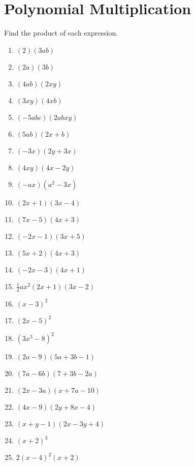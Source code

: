 \documentclass{article}
\begin{document}
\section{Polynomial Multiplication}
Find the product of each expression.
\begin{enumerate}
\item $(2)(3ab)$
\item $(2a)(3b)$
\item $(4ab)(2xy)$
\item $(3xy)(4xb)$
\item $(-5abc)(2abxy)$
\item $(5ab)(2x+b)$
\item $(-3x)(2y+3x)$
\item $(4xy)(4x-2y)$
\item $(-ax)(a^{2}-3x)$
\item $(2x+1)(3x-4)$
\item $(7x-5)(4x+3)$
\item $(-2x-1)(3x+5)$
\item $(5x+2)(4x+3)$
\item $(-2x-3)(4x+1)$
\item $\frac{1}{2}ax^{2}(2x+1)(3x-2)$
\item $(x-3)^{2}$
\item $(2x-5)^{2}$
\item $(3x^{3}-8)^{2}$
\item $(2a-9)(5a+3b-1)$
\item $(7a-6b)(7+3b-2a)$
\item $(2x-3a)(x+7a-10)$
\item $(4x-9)(2y+8x-4)$
\item $(x+y-1)(2x-3y+4)$
\item $(x+2)^{3}$
\item $2(x-4)^{2}(x+2)$
\end{enumerate}

\newpage
\end{document}
